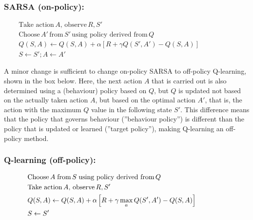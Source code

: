 \begin{pseudocodebox}
\setlength{\abovedisplayskip}{0pt}
\setlength{\belowdisplayskip}{0pt}
\setlength{\abovedisplayshortskip}{0pt}
\setlength{\belowdisplayshortskip}{0pt}
\subsubsection*{SARSA (on-policy):} 

\begin{align*}
& \text{Take action}\, A, \, \text{observe} \, R, S' \\
& \text{Choose}\, A' \, \text{from}\, S' \, \text{using policy derived from} \, Q \\ 
&  Q(S, A) \leftarrow Q(S, A) + \alpha \left[ R + \gamma Q(S', A') - Q(S, A) \right] \hspace{1in}\\
&  S \leftarrow S'; A \leftarrow A'
\end{align*}
\end{pseudocodebox}

A minor change is sufficient to change on-policy SARSA to off-policy Q-learning, shown in the box below. Here, the next action $A$ that is carried out is also determined using a (behaviour) policy based on $Q$, but $Q$ is updated not based on the actually taken action $A$, but based on the optimal action $A'$, that is, the action with the maximum $Q$ value in the following state $S'$. This difference means that the policy that governs behaviour (''behaviour policy'') is different than the policy that is updated or learned (''target policy''), making Q-learning an off-policy method. 

\begin{pseudocodebox}
\setlength{\abovedisplayskip}{0pt}
\setlength{\belowdisplayskip}{0pt}
\setlength{\abovedisplayshortskip}{0pt}
\setlength{\belowdisplayshortskip}{0pt}
\subsubsection*{Q-learning (off-policy):}

\begin{align*}
& \text{Choose} \, A \; \text{from}\, S \; \text{using policy derived from} \, Q \\
& \text{Take action}\, A, \, \text{observe} \, R, S' \\
&  Q(S, A) \leftarrow Q(S, A) + \alpha \left[ R + \gamma \operatorname*{max}_a Q(S', A') - Q(S, A) \right] \hspace{.6in}\\
& S \leftarrow S'
\end{align*}
\end{pseudocodebox}

